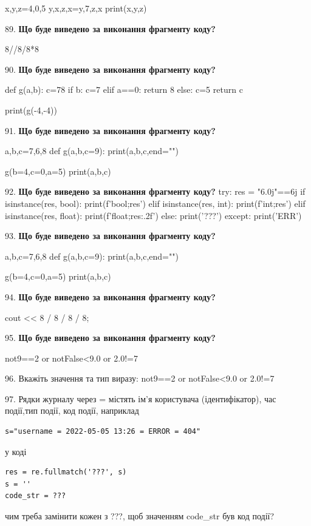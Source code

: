 \documentclass[11pt]{article}
\begin{document}
x,y,z=4,0,5
y,x,z,x=y,7,z,x
print(x,y,z)
\par\vspace{5mm}
89. \textbf{Що буде виведено за виконання фрагменту коду?}

8//8/8*8
\par\vspace{5mm}
90. \textbf{Що буде виведено за виконання фрагменту коду?}

def g(a,b):
    c=78
    if b:
        c=7
    elif a==0:
         return 8
    else: 
        c=5
    return c

print(g(-4,-4))\par\vspace{5mm}
91. \textbf{Що буде виведено за виконання фрагменту коду?}

a,b,c=7,6,8
def g(a,b,c=9):
    print(a,b,c,end="")

g(b=4,c=0,a=5)
print(a,b,c)

\par\vspace{5mm}
92. \textbf{Що буде виведено за виконання фрагменту коду?}
try:
    res = "6.0j"==6j
    if isinstance(res, bool):
        print(f'bool;{res}')
    elif isinstance(res, int):
        print(f'int;{res}')
    elif isinstance(res, float):
        print(f'float;{res:.2f}')
    else:
        print('???')
except:
    print('ERR')
\par\vspace{5mm}
93. \textbf{Що буде виведено за виконання фрагменту коду?}

a,b,c=7,6,8
def g(a,b,c=9):
    print(a,b,c,end="")

g(b=4,c=0,a=5)
print(a,b,c)

\par\vspace{5mm}
94. \textbf{Що буде виведено за виконання фрагменту коду?}

cout << 8 / 8 / 8 / 8;
\par\vspace{5mm}
95. \textbf{Що буде виведено за виконання фрагменту коду?}

not9==2 or notFalse<9.0 or 2.0!=7
\par\vspace{5mm}
96. 
Вкажіть значення та тип виразу:
not9==2 or notFalse<9.0 or 2.0!=7
\par\vspace{5mm}
97. 
Рядки журналу через = містять ім'я користувача (ідентифікатор), час події,тип події, код події, наприклад
\begin{verbatim}
s="username = 2022-05-05 13:26 = ERROR = 404"
\end{verbatim}
у коді 
\begin{verbatim}
res = re.fullmatch('???', s) 
s = ''
code_str = ??? 
\end{verbatim}
чим треба замінити кожен з ???, щоб значенням code\_str був код події? 
\end{document}
